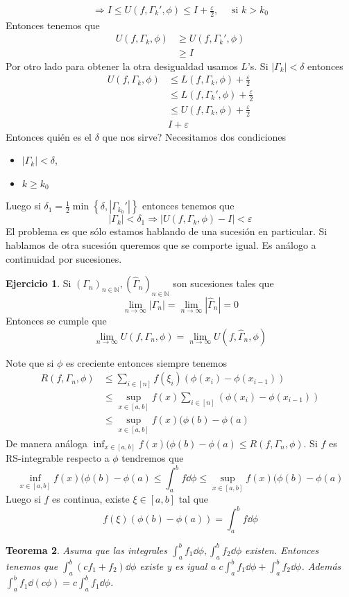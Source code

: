 \documentclass[12pt]{article}
\theoremstyle{plain}
\newtheorem{Th}{Teorema}[subsection]   %
\theoremstyle{definition}
\newtheorem{Ej}[Th]{Ejercicio}
\theoremstyle{remark}
\numberwithin{equation}{section}
\newcommand{\bN}{\mathbb{N}}        %
\renewcommand{\geq}{\geqslant}      %
\renewcommand{\leq}{\leqslant}      %
\renewcommand{\:}{\colon}           %
\newcommand{\conj}[1]{\left\lbrace#1\right\rbrace}
\newcommand{\bonj}[1]{\left\lbrack#1\right\rbrack}
\begin{document}
\begin{multicols}{2}
\begin{ptcbp}
\begin{gather*}
\Rightarrow I\leq U(f,\Gamma_k',\phi)\leq I+\frac{\varepsilon}{2},\quad\text{ si } k>k_0
\end{gather*}
Entonces tenemos que
\begin{align*}
  U(f,\Gamma_k,\phi) & \geq U(f,\Gamma_k',\phi)\\
  &\geq I
\end{align*}
Por otro lado para obtener la otra desigualdad usamos $L$'s. Si $|\Gamma_k|<\delta$ entonces
\begin{align*}
  U(f,\Gamma_k,\phi) &\leq L(f,\Gamma_k,\phi)+\frac{\varepsilon}{2}\\
  &\leq L(f,\Gamma_k',\phi)+\frac{\varepsilon}{2}\\
  &\leq U(f,\Gamma_k,\phi)+\frac{\varepsilon}{2}\\
  & I+\varepsilon
\end{align*}
Entonces quién es el $\delta$ que nos sirve? Necesitamos dos condiciones
\begin{itemize}
  \item $|\Gamma_k|<\delta$,
  \item $k\geq k_0$
\end{itemize}
Luego  si $\delta_1=\frac{1}{2}\min\conj{\delta,|\Gamma_{k_0}'|}$ entonces tenemos que
$$|\Gamma_k|<\delta_1\Rightarrow |U(f,\Gamma_k,\phi)-I|<\varepsilon$$
El problema es que sólo estamos hablando de una sucesión en particular. Si hablamos de otra sucesión queremos que se comporte igual. Es análogo a continuidad por sucesiones.
\end{ptcbp}

\begin{Ej}
  Si $(\Gamma_n)_{n\in\bN},(\hat{\Gamma}_n)_{n\in\bN}$ son sucesiones tales que
  $$\lim_{n\to\infty}|\Gamma_n|=\lim_{n\to\infty}|\hat{\Gamma}_n|=0$$
  Entonces se cumple que
  $$\lim_{n\to\infty}U(f,\Gamma_n,\phi)=\lim_{n\to\infty}U(f,\hat{\Gamma}_n,\phi)$$
\end{Ej}

Note que si $\phi$ es creciente entonces siempre tenemos
\begin{align*}
   R(f,\Gamma_n,\phi)&\leq \sum_{i\in\bonj{n}}f(\xi_i)(\phi(x_i)-\phi(x_{i-1}))\\
   &\leq \sup_{x\in\bonj{a,b}}f(x)\sum_{i\in\bonj{n}}(\phi(x_i)-\phi(x_{i-1}))\\
   &\leq\sup_{x\in\bonj{a,b}}f(x)(\phi(b)-\phi(a)
\end{align*}
De manera análoga $\inf_{x\in\bonj{a,b}}f(x)(\phi(b)-\phi(a)\leq R(f,\Gamma_n,\phi)$. Si $f$ es RS-integrable respecto a $\phi$ tendremos que
$$\inf_{x\in\bonj{a,b}}f(x)(\phi(b)-\phi(a)\leq\int_{a}^{b}f\dd\phi\leq\sup_{x\in\bonj{a,b}}f(x)(\phi(b)-\phi(a)$$
Luego si $f$ es continua, existe $\xi\in\bonj{a,b}$ tal que
$$f(\xi)(\phi(b)-\phi(a))=\int_{a}^{b}f\dd\phi$$
\begin{Th}
  Asuma que las integrales $\int_{a}^{b}f_1\dd\phi, \int_{a}^{b}f_2\dd\phi$ existen. Entonces tenemos que $\int_{a}^{b}(cf_1+f_2)\dd\phi$ existe y es igual a $c\int_{a}^{b}f_1\dd\phi+\int_{a}^{b}f_2\dd\phi$. Además $\int_{a}^{b}f_1\dd (c\phi)=c\int_{a}^{b}f_1\dd\phi$.
\end{Th}


\end{multicols}
\end{document}

